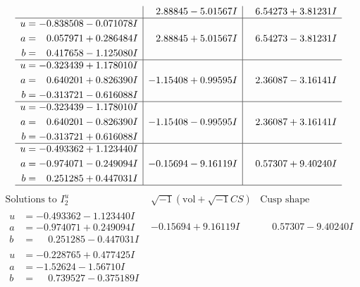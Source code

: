 \documentclass[1p]{elsarticle_modified}
\theoremstyle{definition}
\newcommand{\I}{\sqrt{-1}}
\begin{document}
$$\begin{array}{c|c|c}
 & \phantom{-}2.88845 - 5.01567 I & \phantom{-}6.54273 + 3.81231 I \\ \hline\begin{aligned}
u &= -0.838508 - 0.071078 I \\
a &= \phantom{-}0.057971 + 0.286484 I \\
b &= \phantom{-}0.417658 - 1.125080 I\end{aligned}
 & \phantom{-}2.88845 + 5.01567 I & \phantom{-}6.54273 - 3.81231 I \\ \hline\begin{aligned}
u &= -0.323439 + 1.178010 I \\
a &= \phantom{-}0.640201 + 0.826390 I \\
b &= -0.313721 - 0.616088 I\end{aligned}
 & -1.15408 + 0.99595 I & \phantom{-}2.36087 - 3.16141 I \\ \hline\begin{aligned}
u &= -0.323439 - 1.178010 I \\
a &= \phantom{-}0.640201 - 0.826390 I \\
b &= -0.313721 + 0.616088 I\end{aligned}
 & -1.15408 - 0.99595 I & \phantom{-}2.36087 + 3.16141 I \\ \hline\begin{aligned}
u &= -0.493362 + 1.123440 I \\
a &= -0.974071 - 0.249094 I \\
b &= \phantom{-}0.251285 + 0.447031 I\end{aligned}
 & -0.15694 - 9.16119 I & \phantom{-}0.57307 + 9.40240 I\\
 \hline 
 \end{array}$$\newpage$$\begin{array}{c|c|c}  
\text{Solutions to }I^u_{2}& \I (\text{vol} + \sqrt{-1}CS) & \text{Cusp shape}\\
 \hline 
\begin{aligned}
u &= -0.493362 - 1.123440 I \\
a &= -0.974071 + 0.249094 I \\
b &= \phantom{-}0.251285 - 0.447031 I\end{aligned}
 & -0.15694 + 9.16119 I & \phantom{-}0.57307 - 9.40240 I \\ \hline\begin{aligned}
u &= -0.228765 + 0.477425 I \\
a &= -1.52624 - 1.56710 I \\
b &= \phantom{-}0.739527 - 0.375189 I\end{aligned}

\end{array}$$
\end{document}
